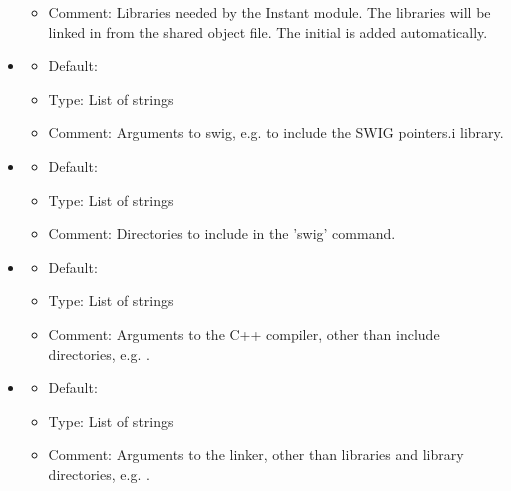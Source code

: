 \begin{itemize}
\begin{itemize}
    \item Comment: Libraries needed by the Instant module. The libraries will
      be linked in from the shared object file. The initial  is added
      automatically.
  \end{itemize}
\item {}
  \begin{itemize}
    \item Default: 
    \item Type: List of strings
    \item Comment: Arguments to swig, e.g. \emp{['-lpointers.i']}
      to include the SWIG pointers.i library.
  \end{itemize}
\item {}
  \begin{itemize}
    \item Default: \emp{[]}
    \item Type: List of strings
    \item Comment: Directories to include in the 'swig' command.
  \end{itemize}
\item {}
  \begin{itemize}
    \item Default: \emp{['-O2']}
    \item Type: List of strings
    \item Comment: Arguments to the C++ compiler, other than include
      directories, e.g. .
  \end{itemize}
\item {}
  \begin{itemize}
    \item Default: \emp{[]}
    \item Type: List of strings
    \item Comment: Arguments to the linker, other than libraries and library
      directories, e.g. \emp{['-E', '-U']}.
  \end{itemize}

\end{itemize}
